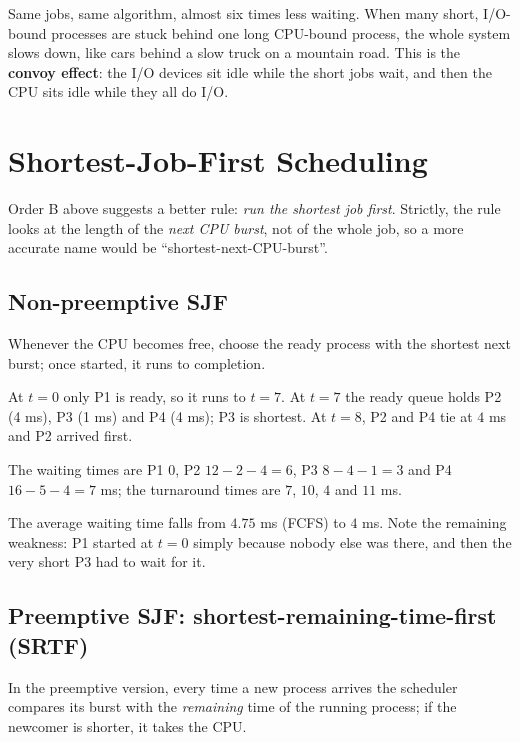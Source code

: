 \documentclass[11pt,a4paper]{article}
\newcommand{\term}[1]{\textbf{\color{mintdeep}#1}}
\begin{document}
Same jobs, same algorithm, almost six times less waiting. When many short, I/O-bound processes are stuck behind one long CPU-bound process, the whole system slows down, like cars behind a slow truck on a mountain road. This is the \term{convoy effect}: the I/O devices sit idle while the short jobs wait, and then the CPU sits idle while they all do I/O.

\section{Shortest-Job-First Scheduling}

Order B above suggests a better rule: \emph{run the shortest job first}. Strictly, the rule looks at the length of the \emph{next CPU burst}, not of the whole job, so a more accurate name would be ``shortest-next-CPU-burst''.

\subsection{Non-preemptive SJF}

Whenever the CPU becomes free, choose the ready process with the shortest next burst; once started, it runs to completion.

\begin{center}
\end{center}

At $t=0$ only P1 is ready, so it runs to $t=7$. At $t=7$ the ready queue holds P2 (4 ms), P3 (1 ms) and P4 (4 ms); P3 is shortest. At $t=8$, P2 and P4 tie at $4$ ms and P2 arrived first.

The waiting times are P1 $0$, P2 $12-2-4=6$, P3 $8-4-1=3$ and P4 $16-5-4=7$ ms; the turnaround times are $7$, $10$, $4$ and $11$ ms.


The average waiting time falls from $4.75$ ms (FCFS) to $4$ ms. Note the remaining weakness: P1 started at $t=0$ simply because nobody else was there, and then the very short P3 had to wait for it.

\subsection{Preemptive SJF: shortest-remaining-time-first (SRTF)}

In the preemptive version, every time a new process arrives the scheduler compares its burst with the \emph{remaining} time of the running process; if the newcomer is shorter, it takes the CPU.
\end{document}
